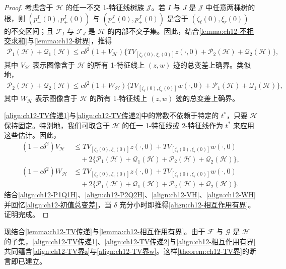 \documentclass[../../main.tex]{subfiles}
\begin{document}
\begin{proof}
考虑含于 $\mathscr{H}$ 的任一不交 1-特征线树族 $\mathscr{J}$。若 $I$ 与 $J$ 是 $\mathscr{J}$ 中任意两棵树的根，则 $(p_-^I(0),p_+^I(0))$ 与 $(p_-^J(0),p_+^J(0))$ 是含于 $(\zeta_\ell(0),\xi_r(0))$ 的不交区间；且 $\mathscr{F}_I$ 与 $\mathscr{F}_J$ 是 $\mathscr{H}$ 的内部不交子集。因此，结合\cref{lemma:ch12-不相交求和}与\cref{lemma:ch12-树界}，推得
\begin{align}
\mathscr{P}_1(\mathscr{H})+\mathscr{Q}_1(\mathscr{H})\leqslant c\delta^2(1+V_{\mathscr{H}})\{TV_{[\zeta_\ell(0),\xi_r(0)]}z(\cdot,0)+\mathscr{P}_2(\mathscr{H})+\mathscr{Q}_2(\mathscr{H})\},
\label{align:ch12-P1Q1H}
\end{align}
其中 $V_{\mathscr{H}}$ 表示图像含于 $\mathscr{H}$ 的所有 1-特征线上 $(z,w)$ 迹的总变差上确界。类似地，
\begin{align}
\mathscr{P}_2(\mathscr{H})+\mathscr{Q}_2(\mathscr{H})\leqslant c\delta^2(1+W_{\mathscr{H}})\{TV_{[\zeta_\ell(0),\xi_r(0)]}w(\cdot,0)+\mathscr{P}_1(\mathscr{H})+\mathscr{Q}_1(\mathscr{H})\},
\label{align:ch12-P2Q2H}
\end{align}
其中 $W_{\mathscr{H}}$ 表示图像含于 $\mathscr{H}$ 的所有 1-特征线上 $(z,w)$ 迹的总变差上确界。

\eqref{align:ch12-TV传递1}与\eqref{align:ch12-TV传递2}中的常数不依赖于特定的 $t^*$，只要 $\mathscr{H}$ 保持固定。特别地，我们可取含于 $\mathscr{H}$ 的任一 1-特征线或 2-特征线作为 $t^*$ 来应用这些估计。因此，
\begin{align}
(1-c\delta^2)V_{\mathscr{H}}&\leqslant TV_{[\zeta_\ell(0),\xi_r(0)]}z(\cdot,0)+TV_{[\zeta_\ell(0),\xi_r(0)]}w(\cdot,0)\nonumber\\
&\quad+2\{\mathscr{P}_1(\mathscr{H})+\mathscr{Q}_1(\mathscr{H})+\mathscr{P}_2(\mathscr{H})+\mathscr{Q}_2(\mathscr{H})\},
\label{align:ch12-VH}\\
(1-c\delta^2)W_{\mathscr{H}}&\leqslant TV_{[\zeta_\ell(0),\xi_r(0)]}z(\cdot,0)+TV_{[\zeta_\ell(0),\xi_r(0)]}w(\cdot,0)\nonumber\\
&\quad+2\{\mathscr{P}_1(\mathscr{H})+\mathscr{Q}_1(\mathscr{H})+\mathscr{P}_2(\mathscr{H})+\mathscr{Q}_2(\mathscr{H})\}.
\label{align:ch12-WH}
\end{align}
结合\eqref{align:ch12-P1Q1H}、\eqref{align:ch12-P2Q2H}、\eqref{align:ch12-VH}、\eqref{align:ch12-WH}并回忆\eqref{align:ch12-初值总变差}，当 $\delta$ 充分小时即推得\eqref{align:ch12-相互作用有界}。证明完成。
\end{proof}

现结合\cref{lemma:ch12-TV传递}与\cref{lemma:ch12-相互作用有界}。由于 $\mathscr{F}$ 与 $\mathscr{G}$ 是 $\mathscr{H}$ 的子集，\eqref{align:ch12-TV传递1}、\eqref{align:ch12-TV传递2}与\eqref{align:ch12-相互作用有界}共同蕴含\eqref{align:ch12-TV界z}与\eqref{align:ch12-TV界w}。这样\cref{theorem:ch12-TV界}的断言即已建立。
\end{document}
